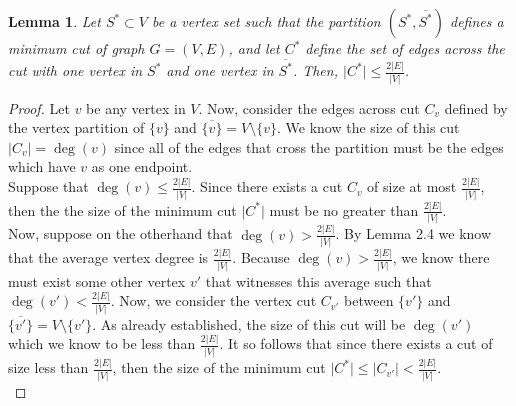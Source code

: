 \documentclass[psamsfonts, 10pt]{amsart}
\newtheorem{lem}[thm]{Lemma}
\theoremstyle{definition}
\theoremstyle{remark}
\numberwithin{equation}{section}
\begin{document}
\begin{lem}
Let $S^* \subset V$ be a vertex set such that the partition $(S^*, \overline{S^*})$ defines a minimum cut of graph $G = (V, E)$, and let $C^*$ define the set of edges across the cut with one vertex in $S^*$ and one vertex in $\overline{S^*}$. Then, $\lvert C^\ast \rvert \leq \frac{2 \lvert E \rvert }{\rvert V \lvert}$.
\end{lem}
\begin{proof}
Let $v$ be any vertex in $V$. Now, consider the edges across cut $C_v$ defined by the vertex partition of $\{v\}$ and $\overline{\{v\}} = V \setminus \{v\}$. We know the size of this cut $\lvert C_v \rvert = \deg(v)$ since all of the edges that cross the partition must be the edges which have $v$ as one endpoint.\\

Suppose that $\deg(v) \leq \frac{2\lvert E \rvert}{\lvert V \rvert}$. Since there exists a cut $C_v$ of size at most $\frac{2\lvert E \rvert}{\lvert V \rvert}$, then the the size of the minimum cut $\lvert C^* \rvert$ must be no greater than $\frac{2\lvert E \rvert}{\lvert V \rvert}$.\\

Now, suppose on the otherhand that  $\deg(v) > \frac{2\lvert E \rvert}{\lvert V \rvert}$. By Lemma 2.4 we know that the average vertex degree is $\frac{2 \lvert E \rvert}{\lvert V \rvert}$. Because $\deg(v) > \frac{2\lvert E \rvert}{\lvert V \rvert}$, we know there must exist some other vertex $v'$ that witnesses this average such that $\deg(v') < \frac{2\lvert E \rvert}{\lvert V \rvert}$. Now, we consider the vertex cut $C_{v'}$ between $\{v'\}$ and $\overline{\{v'\}} = V \setminus \{v'\}$. As already established, the size of this cut will be $\deg(v')$ which we know to be less than $\frac{2\lvert E \rvert}{\lvert V \rvert}$. It so follows that since there exists a cut of size less than $\frac{2\lvert E \rvert}{\lvert V \rvert}$, then the size of the minimum cut $\lvert C^* \rvert \leq \lvert C_{v'} \rvert < \frac{2\lvert E \rvert}{\lvert V \rvert}$.\\
\end{proof}
\end{document}
